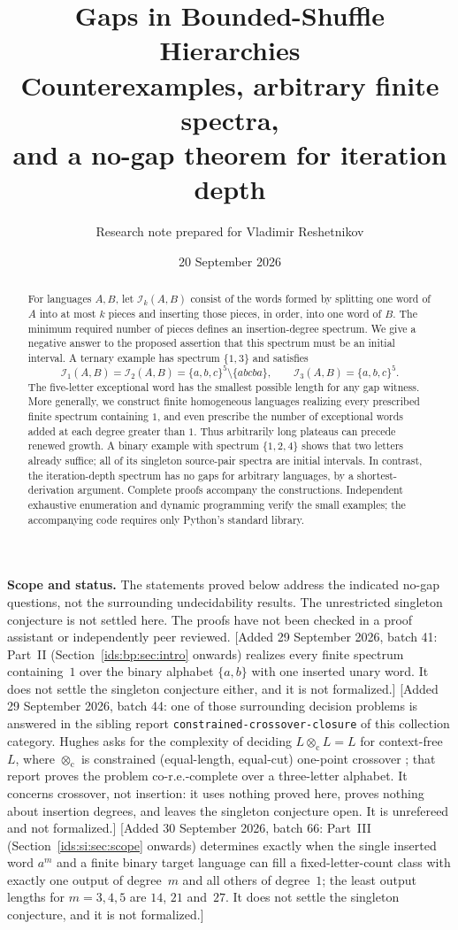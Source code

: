 \documentclass[11pt,letterpaper]{article}
\title{\vspace{-1.4em}\textbf{Gaps in Bounded-Shuffle Hierarchies}\\[0.45em]
\large Counterexamples, arbitrary finite spectra,\\and a no-gap theorem for iteration depth}
\author{Research note prepared for Vladimir Reshetnikov}
\date{20 September 2026}
\theoremstyle{definition}\newtheorem{definition}[theorem]{Definition}
\theoremstyle{remark}\newtheorem{remark}[theorem]{Remark}
\theoremstyle{definition}\newtheorem{question}[theorem]{Question}
\begin{document}
\maketitle
\begin{abstract}
For languages $A,B$, let $\mathcal I_k(A,B)$ consist of the words formed by splitting one word of $A$ into at most $k$ pieces and inserting those pieces, in order, into one word of $B$. The minimum required number of pieces defines an insertion-degree spectrum. We give a negative answer to the proposed assertion that this spectrum must be an initial interval. A ternary example has spectrum $\{1,3\}$ and satisfies
\[
 \mathcal I_1(A,B)=\mathcal I_2(A,B)=\{a,b,c\}^5\setminus\{abcba\},
 \qquad \mathcal I_3(A,B)=\{a,b,c\}^5.
\]
The five-letter exceptional word has the smallest possible length for any gap witness. More generally, we construct finite homogeneous languages realizing every prescribed finite spectrum containing $1$, and even prescribe the number of exceptional words added at each degree greater than $1$. Thus arbitrarily long plateaus can precede renewed growth. A binary example with spectrum $\{1,2,4\}$ shows that two letters already suffice; all of its singleton source-pair spectra are initial intervals. In contrast, the iteration-depth spectrum has no gaps for arbitrary languages, by a shortest-derivation argument. Complete proofs accompany the constructions. Independent exhaustive enumeration and dynamic programming verify the small examples; the accompanying code requires only Python's standard library.
\end{abstract}

\noindent\textbf{Scope and status.} The statements proved below address the indicated no-gap questions, not the surrounding undecidability results. The unrestricted singleton conjecture is not settled here. The proofs have not been checked in a proof assistant or independently peer reviewed.
[Added 29 September 2026, batch 41: Part~II (Section~\ref{ids:bp:sec:intro} onwards) realizes every finite spectrum containing~$1$ over the binary alphabet $\{a,b\}$ with one inserted unary word. It does not settle the singleton conjecture either, and it is not formalized.]
[Added 29 September 2026, batch 44: one of those surrounding decision problems is answered in the sibling report \texttt{constrained-crossover-closure} of this collection category. Hughes asks for the complexity of deciding $L\otimes_{\mathrm c}L=L$ for context-free~$L$, where $\otimes_{\mathrm c}$ is constrained (equal-length, equal-cut) one-point crossover \cite[Section~4, pp.~3--4]{Hughes2026}; that report proves the problem co-r.e.-complete over a three-letter alphabet. It concerns crossover, not insertion: it uses nothing proved here, proves nothing about insertion degrees, and leaves the singleton conjecture open. It is unrefereed and not formalized.]
[Added 30 September 2026, batch 66: Part~III (Section~\ref{ids:si:sec:scope} onwards) determines exactly when the single inserted word $a^m$ and a finite binary target language can fill a fixed-letter-count class with exactly one output of degree~$m$ and all others of degree~$1$; the least output lengths for $m=3,4,5$ are $14$, $21$ and~$27$. It does not settle the singleton conjecture, and it is not formalized.]
\end{document}
